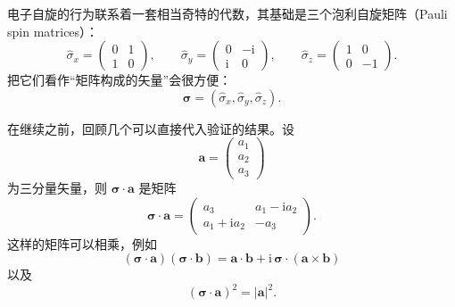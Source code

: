 电子自旋的行为联系着一套相当奇特的代数，其基础是三个泡利自旋矩阵（Pauli spin
matrices）：
\begin{equation*}
\hat{\sigma}_x = \begin{pmatrix} 0 & 1 \\ 1 & 0 \end{pmatrix},\qquad
\hat{\sigma}_y = \begin{pmatrix} 0 & -\mathrm{i} \\ \mathrm{i} & 0 \end{pmatrix},\qquad
\hat{\sigma}_z = \begin{pmatrix} 1 & 0 \\ 0 & -1 \end{pmatrix}.\tag{1.36}
\end{equation*}
把它们看作“矩阵构成的矢量”会很方便：
\begin{equation*}
\boldsymbol{\sigma} = (\hat{\sigma}_x, \hat{\sigma}_y, \hat{\sigma}_z).\tag{1.37}
\end{equation*}

在继续之前，回顾几个可以直接代入验证的结果。设
\begin{equation*}
\mathbf{a} = \begin{pmatrix} a_1 \\ a_2 \\ a_3 \end{pmatrix}\tag{1.38}
\end{equation*}
为三分量矢量，则 $\boldsymbol{\sigma}\cdot\mathbf{a}$ 是矩阵
\begin{equation*}
\boldsymbol{\sigma}\cdot\mathbf{a} = \begin{pmatrix} a_3 & a_1-\mathrm{i}a_2 \\ a_1+\mathrm{i}a_2 & -a_3 \end{pmatrix}.\tag{1.39}
\end{equation*}
这样的矩阵可以相乘，例如
\begin{equation*}
(\boldsymbol{\sigma}\cdot\mathbf{a})(\boldsymbol{\sigma}\cdot\mathbf{b}) = \mathbf{a}\cdot\mathbf{b} + \mathrm{i}\,\boldsymbol{\sigma}\cdot(\mathbf{a}\times\mathbf{b})\tag{1.40}
\end{equation*}
以及
\begin{equation*}
(\boldsymbol{\sigma}\cdot\mathbf{a})^{2} = |\mathbf{a}|^{2}.\tag{1.41}
\end{equation*}

